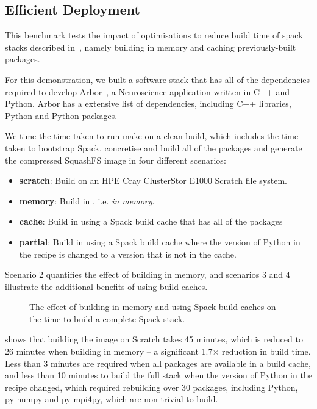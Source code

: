 \subsection{Efficient Deployment}

This benchmark tests the impact of optimisations to reduce build time of spack stacks described in~, namely building in memory and caching previously-built packages.

For this demonstration, we built a software stack that has all of the dependencies required to develop Arbor~\cite{paper:arbor2019,software:arbor}, a Neuroscience application written in C++ and Python.
Arbor has a extensive list of dependencies, including C++ libraries, Python and Python packages.

We time the time taken to run make on a clean build, which includes the time taken to bootstrap Spack, concretise and build all of the packages and generate the compressed SquashFS image in four different scenarios:
\begin{itemize}
    \item \textbf{scratch}: Build on an HPE Cray ClusterStor E1000 Scratch file system.
    \item \textbf{memory}: Build in , i.e. \emph{in memory}.
    \item \textbf{cache}: Build in  using a Spack build cache that has all of the packages 
    \item \textbf{partial}: Build in  using a Spack build cache where the version of Python in the recipe is changed to a version that is not in the cache.
\end{itemize}
Scenario 2 quantifies the effect of building in memory, and scenarios 3 and 4 illustrate the additional benefits of using build caches.

\begin{figure}[htp!]
    \begin{center}
        
    \end{center}
    \caption{The effect of building in memory and using Spack build caches on the time to build a complete Spack stack.}
    \label{fig:image-build}
\end{figure}

 shows that building the image on Scratch takes 45 minutes, which is reduced to 26 minutes when building in memory -- a significant 1.7$\times$ reduction in build time.
Less than 3 minutes are required when all packages are available in a build cache, and less than 10 minutes to build the full stack when the version of Python in the recipe changed, which required rebuilding over 30 packages, including Python, py-numpy and py-mpi4py, which are non-trivial to build.

